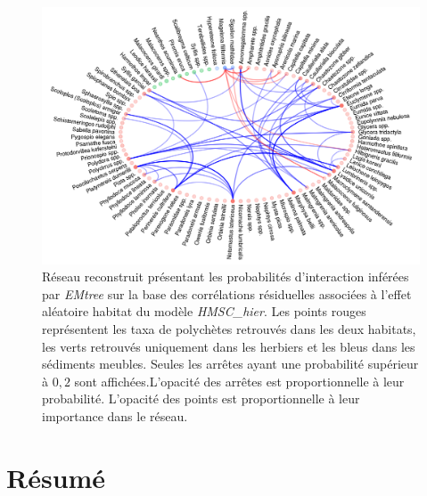 \documentclass[12pt,]{article}
\makeatletter
\def\maxwidth{\ifdim\Gin@nat@width>\linewidth\linewidth
\else\Gin@nat@width\fi}
\let\Oldincludegraphics\includegraphics
\renewcommand{\includegraphics}[1]{\Oldincludegraphics[width=\maxwidth]{#1}}
\makeatother
\begin{document}
\begin{figure}
\hypertarget{fig:nethmschierhab}{%
\centering
\includegraphics{figures/hmsc-hier-habitat-network-1.png}
\caption{Réseau reconstruit présentant les probabilités d'interaction
inférées par \emph{EMtree} sur la base des corrélations résiduelles
associées à l'effet aléatoire habitat du modèle \emph{HMSC\_hier}. Les
points rouges représentent les taxa de polychètes retrouvés dans les
deux habitats, les verts retrouvés uniquement dans les herbiers et les
bleus dans les sédiments meubles. Seules les arrêtes ayant une
probabilité supérieur à \(0,2\) sont affichées.L'opacité des arrêtes est
proportionnelle à leur probabilité. L'opacité des points est
proportionnelle à leur importance dans le
réseau.}\label{fig:nethmschierhab}
}
\end{figure}

\hypertarget{ruxe9sumuxe9}{%
\section{Résumé}\label{ruxe9sumuxe9}}
\end{document}
